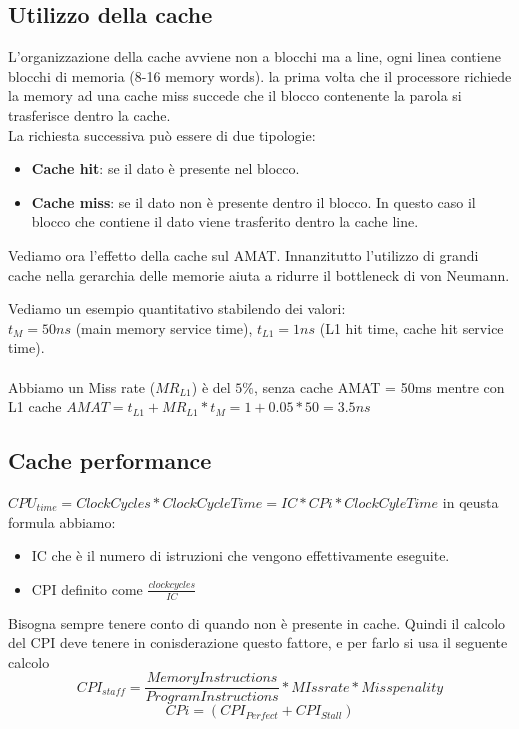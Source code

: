 \subsection{Utilizzo della cache}
L'organizzazione della cache avviene non a blocchi ma a line, ogni linea contiene blocchi di memoria (8-16 memory words). la prima volta che il processore richiede la memory ad una cache miss succede che il blocco contenente la parola si trasferisce dentro la cache. \\
La richiesta successiva può essere di due tipologie:
\begin{itemize}
    \item \textbf{Cache hit}: se il dato è presente nel blocco.
    \item \textbf{Cache miss}: se il dato non è presente dentro il blocco. In questo caso il blocco che contiene il dato viene trasferito dentro la cache line.
\end{itemize}

Vediamo ora l'effetto della cache sul AMAT. Innanzitutto l'utilizzo di grandi cache nella gerarchia delle memorie aiuta a ridurre il bottleneck di von Neumann. 
\begin{example}
Vediamo un esempio quantitativo stabilendo dei valori:\\
$t_M = 50ns$ (main memory service time), $t_{L1} = 1ns$ (L1 hit time, cache hit service time). \\\\
Abbiamo un Miss rate ($MR_{L1}$) è del $5\%$, senza cache AMAT = 50ms mentre con L1 cache $AMAT = t_{L1} + MR_{L1} * t_M = 1 + 0.05 * 50 = 3.5ns$
\end{example}

\subsection{Cache performance}
\(CPU_{time} = ClockCycles * ClockCycleTime = IC * CPi * ClockCyleTime\) in qeusta formula abbiamo:
\begin{itemize}
    \item IC che è il numero di istruzioni che vengono effettivamente eseguite.
    \item CPI definito come \(\frac{clockcycles}{IC}\)
\end{itemize}

Bisogna sempre tenere conto di quando non è presente in cache. Quindi il calcolo del CPI deve tenere in conisderazione questo fattore, e per farlo si usa il seguente calcolo
\[CPI_{staff} = \frac{Memory Instructions}{Program Instructions} * MIss rate * Miss penality\]
\[CPi = (CPI_{Perfect} + CPI_{Stall})\]

